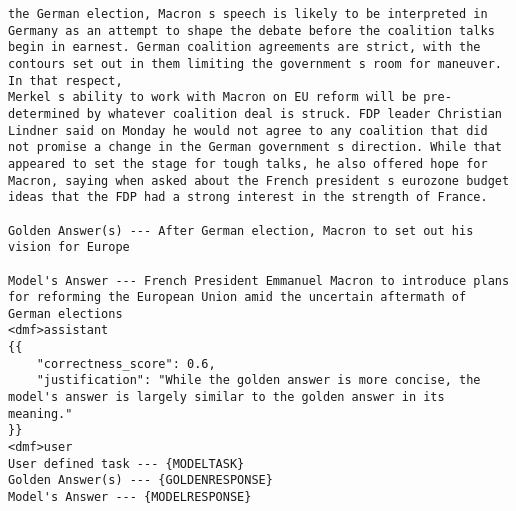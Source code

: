 \begin{tcolorbox}[
    title=Prompt format for the Llama 3.1 70b evaluator instruct LLM, label=prompt format, breakable, colback=gray!10, colframe=gray!50
]
\begin{verbatim}
the German election, Macron s speech is likely to be interpreted in Germany as an attempt to shape the debate before the coalition talks begin in earnest. German coalition agreements are strict, with the contours set out in them limiting the government s room for maneuver. In that respect, 
Merkel s ability to work with Macron on EU reform will be pre-determined by whatever coalition deal is struck. FDP leader Christian Lindner said on Monday he would not agree to any coalition that did not promise a change in the German government s direction. While that appeared to set the stage for tough talks, he also offered hope for Macron, saying when asked about the French president s eurozone budget ideas that the FDP had a strong interest in the strength of France.

Golden Answer(s) --- After German election, Macron to set out his vision for Europe

Model's Answer --- French President Emmanuel Macron to introduce plans for reforming the European Union amid the uncertain aftermath of German elections
<dmf>assistant
{{
    "correctness_score": 0.6,
    "justification": "While the golden answer is more concise, the model's answer is largely similar to the golden answer in its meaning."
}}
<dmf>user
User defined task --- {MODELTASK}
Golden Answer(s) --- {GOLDENRESPONSE}
Model's Answer --- {MODELRESPONSE}
\end{verbatim}
\end{tcolorbox}





